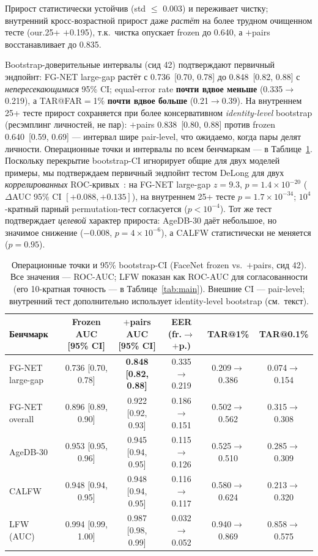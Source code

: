 \documentclass[journal]{IEEEtran}
\begin{document}
Прирост статистически устойчив (std $\leq$ 0.003) и переживает чистку; внутренний кросс-возрастной прирост даже \emph{растёт} на более трудном очищенном тесте (our.25+ $+$0.195), т.к.\ чистка опускает frozen до 0.640, а $+$pairs восстанавливает до 0.835.

Bootstrap-доверительные интервалы (сид 42) подтверждают первичный эндпойнт: FG-NET large-gap растёт с 0.736~[0.70, 0.78] до 0.848~[0.82, 0.88] с \emph{непересекающимися} 95\% CI; equal-error rate \textbf{почти вдвое меньше} (0.335$\to$0.219), а TAR@FAR$=$1\% \textbf{почти вдвое больше} (0.21$\to$0.39). На внутреннем 25+ тесте прирост сохраняется при более консервативном \emph{identity-level} bootstrap (ресэмплинг личностей, не пар): $+$pairs 0.838~[0.80, 0.88] против frozen 0.640~[0.59, 0.69] --- интервал шире pair-level, что ожидаемо, когда пары делят личности. Операционные точки и интервалы по всем бенчмаркам --- в Таблице~\ref{tab:stats}. Поскольку перекрытие bootstrap-CI игнорирует общие для двух моделей примеры, мы подтверждаем первичный эндпойнт тестом DeLong для двух \emph{коррелированных} ROC-кривых~\cite{delong1988}: на FG-NET large-gap $z=9.3$, $p=1.4\times10^{-20}$ ($\Delta$AUC 95\% CI $[+0.088,+0.135]$), на внутреннем 25+ тесте $p=1.7\times10^{-34}$; $10^4$-кратный парный permutation-тест согласуется ($p<10^{-4}$). Тот же тест подтверждает \emph{целевой} характер прироста: AgeDB-30 даёт небольшое, но значимое снижение ($-$0.008, $p=4\times10^{-6}$), а CALFW статистически не меняется ($p=0.95$).

\begin{table}[!t]
\renewcommand{\arraystretch}{1.2}
\caption{Операционные точки и 95\% bootstrap-CI (FaceNet frozen vs.\ $+$pairs, сид 42). Все значения --- ROC-AUC; LFW показан как ROC-AUC для согласованности (его 10-кратная точность --- в Таблице~\ref{tab:main}). Внешние CI --- pair-level; внутренний тест дополнительно использует identity-level bootstrap (см.\ текст).}
\label{tab:stats}
\centering
\footnotesize
\begin{tabular}{@{}lccccc@{}}
\toprule
Бенчмарк & Frozen AUC [95\% CI] & $+$pairs AUC [95\% CI] & EER (fr.$\to$$+$p.) & TAR@1\% & TAR@0.1\% \\
\midrule
FG-NET large-gap & 0.736 [0.70, 0.78] & \textbf{0.848 [0.82, 0.88]} & 0.335$\to$0.219 & 0.209$\to$0.386 & 0.074$\to$0.154 \\
FG-NET overall & 0.896 [0.89, 0.90] & 0.922 [0.92, 0.93] & 0.186$\to$0.151 & 0.502$\to$0.562 & 0.315$\to$0.308 \\
AgeDB-30 & 0.953 [0.95, 0.96] & 0.945 [0.94, 0.95] & 0.115$\to$0.126 & 0.525$\to$0.510 & 0.285$\to$0.309 \\
CALFW & 0.948 [0.94, 0.95] & 0.948 [0.94, 0.95] & 0.116$\to$0.117 & 0.580$\to$0.624 & 0.213$\to$0.320 \\
LFW (AUC) & 0.994 [0.99, 1.00] & 0.987 [0.98, 0.99] & 0.032$\to$0.052 & 0.940$\to$0.869 & 0.858$\to$0.575 \\
\bottomrule
\end{tabular}
\end{table}
\end{document}

